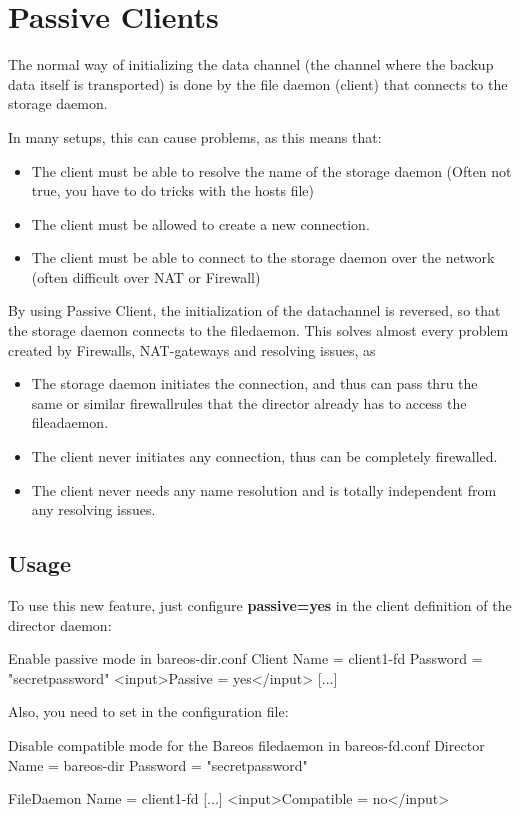 \section{Passive Clients}
\label{PassiveClient}

The normal way of initializing the data channel (the channel where the backup data itself is transported)
is done by the file daemon (client) that connects to the storage daemon.

In many setups, this can cause problems, as this means that:
\begin{itemize}
    \item The client must be able to resolve the name of the storage daemon (Often not true, you have to do tricks with the hosts file)
    \item The client must be allowed to create a new connection.
    \item The client must be able to connect to the storage daemon over the network (often difficult over NAT or Firewall)
\end{itemize}

By using Passive Client, the initialization of the datachannel is reversed, so that the storage daemon connects to the filedaemon.
This solves almost every problem created by Firewalls, NAT-gateways and resolving issues, as

\begin{itemize}
    \item The storage daemon initiates the connection, and thus can pass thru the same or similar firewallrules that the director already has to access the fileadaemon.
    \item The client never initiates any connection, thus can be completely firewalled.
    \item The client never needs any name resolution and is totally independent from any resolving issues.
\end{itemize}

\subsection{Usage}

To use this new feature, just configure  \textbf{passive=yes} in the client definition of the director daemon:
\begin{bconfig}{Enable passive mode in bareos-dir.conf}
Client {
   Name = client1-fd
   Password = "secretpassword"
   <input>Passive = yes</input>
   [...]
}
\end{bconfig}

Also, you need to set  in the  configuration file:
\begin{bconfig}{Disable compatible mode for the Bareos filedaemon in bareos-fd.conf} 
Director {
  Name = bareos-dir
  Password = "secretpassword"
}

FileDaemon {
   Name = client1-fd
   [...]
   <input>Compatible = no</input>
}
\end{bconfig}
